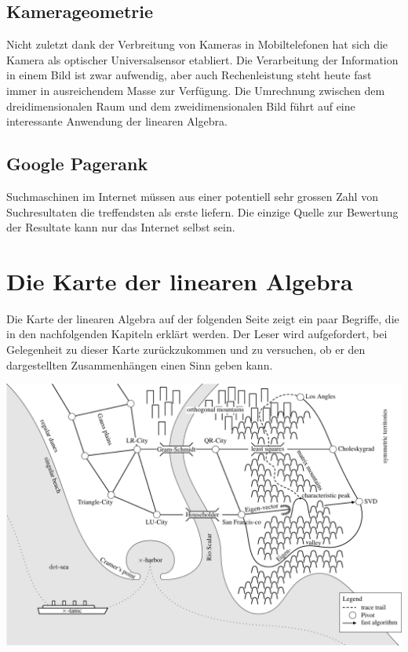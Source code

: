 \subsection*{Kamerageometrie}
Nicht zuletzt dank der Verbreitung von Kameras in Mobiltelefonen hat
sich die Kamera als optischer Universalsensor etabliert.
Die Verarbeitung der Information in einem Bild ist zwar aufwendig,
aber auch Rechenleistung steht heute fast immer in ausreichendem Masse 
zur Verfügung.
Die Umrechnung zwischen dem dreidimensionalen Raum und dem zweidimensionalen
Bild führt auf eine interessante Anwendung der linearen Algebra.

\subsection*{Google Pagerank}
Suchmaschinen im Internet müssen aus einer potentiell sehr grossen Zahl
von Suchresultaten die treffendsten als erste liefern.
Die einzige Quelle zur Bewertung der Resultate kann nur
das Internet selbst sein.

\section*{Die Karte der linearen Algebra}
Die Karte der linearen Algebra auf der folgenden Seite zeigt ein
paar Begriffe, die in den nachfolgenden Kapiteln erklärt werden.
Der Leser wird aufgefordert, bei Gelegenheit zu dieser Karte
zurückzukommen und zu versuchen, ob er den dargestellten
Zusammenhängen einen Sinn geben kann.

\begin{landscape}
\begin{center}
\includegraphics[width=0.95\hsize]{images/linalgmap-1}
\end{center}
\end{landscape}

